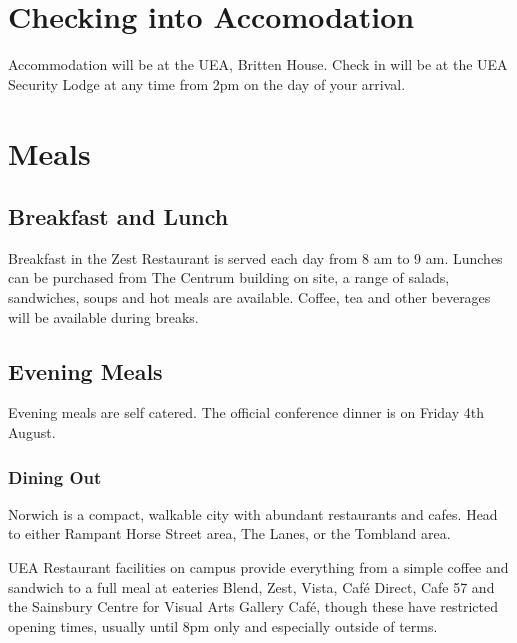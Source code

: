 \documentclass[12pt,]{book}
\theoremstyle{definition}
\theoremstyle{definition}
\theoremstyle{remark}
\begin{document}
\section*{Checking into Accomodation}\label{checking-into-accomodation}

Accommodation will be at the UEA, Britten House. Check in will be at the
UEA Security Lodge at any time from 2pm on the day of your arrival.

\section*{Meals}\label{meals}

\subsection*{Breakfast and Lunch}\label{breakfast-and-lunch}

Breakfast in the Zest Restaurant is served each day from 8 am to 9 am.
Lunches can be purchased from The Centrum building on site, a range of
salads, sandwiches, soups and hot meals are available. Coffee, tea and
other beverages will be available during breaks.

\subsection*{Evening Meals}\label{evening-meals}

Evening meals are self catered. The official conference dinner is on
Friday 4th August.

\subsubsection*{Dining Out}\label{dining-out}

Norwich is a compact, walkable city with abundant restaurants and cafes.
Head to either Rampant Horse Street area, The Lanes, or the Tombland
area.

UEA Restaurant facilities on campus provide everything from a simple
coffee and sandwich to a full meal at eateries Blend, Zest, Vista, Café
Direct, Cafe 57 and the Sainsbury Centre for Visual Arts Gallery Café,
though these have restricted opening times, usually until 8pm only and
especially outside of terms.
\end{document}
